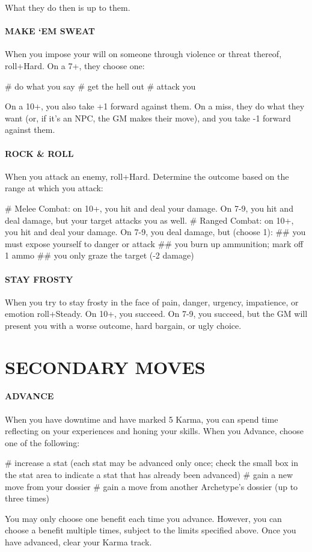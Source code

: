 What they do then is up to them.


\paragraph{MAKE ‘EM SWEAT}
When you impose your will on someone through violence or threat thereof, roll+Hard. On a 7+, they choose one:

\begin{easylist}
    # do what you say
    # get the hell out
    # attack you
\end{easylist}

On a 10+, you also take +1 forward against them. On a miss, they do what they want (or, if it’s an NPC, the GM makes their move), and you take -1 forward against them.


\paragraph{ROCK \& ROLL}
When you attack an enemy, roll+Hard. Determine the outcome based on the range at which you attack:

\begin{easylist}
    # Melee Combat: on 10+, you hit and deal your damage. On 7-9, you hit and deal damage, but your target attacks you as well.
    # Ranged Combat: on 10+, you hit and deal your damage. On 7-9, you deal damage, but (choose 1):
    ## you must expose yourself to danger or attack
    ## you burn up ammunition; mark off 1 ammo
    ## you only graze the target (-2 damage)
\end{easylist}


\paragraph{STAY FROSTY}
When you try to stay frosty in the face of pain, danger, urgency, impatience, or emotion roll+Steady. On 10+, you succeed. On 7-9, you succeed, but the GM will present you with a worse outcome, hard bargain, or ugly choice.



\section{SECONDARY MOVES}

\paragraph{ADVANCE}
When you have downtime and have marked 5 Karma, you can spend time reflecting on your experiences and honing your skills. When you Advance, choose one of the following:
\begin{easylist}
    # increase a stat (each stat may be advanced only once; check the small box in the stat area to indicate a stat that has already been advanced)
    # gain a new move from your dossier
    # gain a move from another Archetype’s dossier (up to three times)
\end{easylist}
You may only choose one benefit each time you advance. However, you can choose a benefit multiple times, subject to the limits specified above. Once you have advanced, clear your Karma track.

